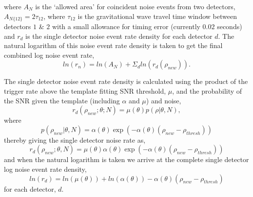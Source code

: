 %
where $A_{N}$ is the `allowed area' for coincident noise events from two detectors, $A_{N\{12\}} = 2\tau_{12}$, where $\tau_{12}$ is the gravitational wave travel time window between detectors $1$ \& $2$ with a small allowance for timing error (currently $0.02$ seconds) and $r_{d}$ is the single detector noise event rate density for each detector $d$. The natural logarithm of this noise event rate density is taken to get the final combined log noise event rate,
%
\begin{equation}
    ln(r_{n}) = ln(A_{N}) +  \Sigma_{d} ln(r_{d}(\rho_{new})) .
\label{eqn:pycbclive-comb-log-noise-rate}
\end{equation}
%

The single detector noise event rate density is calculated using the product of the trigger rate above the template fitting SNR threshold, $\mu$, and the probability of the SNR given the template (including $\alpha$ and $\mu$) and noise,
%
\begin{equation}
    r_{d}(\rho_{new}; {\theta}; N) = \mu(\theta) p(\rho | \theta, N) ,
\label{eqn:pycbclive-single-noise-rate}
\end{equation}
%
where
%
\begin{equation}
    p(\rho_{new} | \theta, N) = \alpha(\theta) \exp\left(-\alpha(\theta)\left(\rho_{new} - \rho_{thresh}\right)\right)
\label{eqn:pycbclive-p-definition}
\end{equation}
%
thereby giving the single detector noise rate as,
%
\begin{equation}
    r_{d}(\rho_{new}; {\theta}, N) = \mu(\theta) \alpha(\theta) \exp\left(-\alpha(\theta)(\rho_{new} - \rho_{thresh})\right)
\label{eqn:pycbclive-single-noise-rate-full}
\end{equation}
%
and when the natural logarithm is taken we arrive at the complete single detector log noise event rate density,
%
\begin{equation}
    ln(r_{d}) = ln(\mu(\theta)) +  ln(\alpha(\theta)) - \alpha(\theta)(\rho_{new} - \rho_{thresh})
\label{eqn:pycbclive-single-log-noise-rate}
\end{equation}
%
for each detector, $d$.


